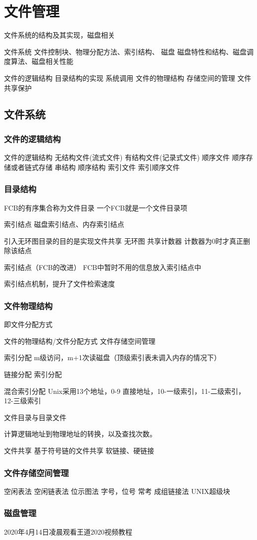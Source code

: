 \chapter{文件管理}

文件系统的结构及其实现，磁盘相关

文件系统
文件控制块、物理分配方法、索引结构、
磁盘
磁盘特性和结构、磁盘调度算法、磁盘相关性能

文件的逻辑结构
目录结构的实现
系统调用
文件的物理结构
存储空间的管理
文件共享保护

\section{文件系统}

\subsection{文件的逻辑结构}
文件的逻辑结构
	无结构文件(流式文件) 
	有结构文件(记录式文件) 
		顺序文件
			顺序存储或者链式存储
			串结构 顺序结构 
		索引文件
		索引顺序文件

\subsection{目录结构}
FCB的有序集合称为文件目录
一个FCB就是一个文件目录项

索引结点
磁盘索引结点、内存索引结点

引入无环图目录的目的是实现文件共享
无环图 共享计数器 计数器为0时才真正删除该结点


索引结点（FCB的改进）
FCB中暂时不用的信息放入索引结点中

索引结点机制，提升了文件检索速度


\subsection{文件物理结构}
即文件分配方式

文件的物理结构/文件分配方式
文件存储空间管理

索引分配
m级访问，m+1次读磁盘（顶级索引表未调入内存的情况下）

链接分配
索引分配

混合索引分配
Unix采用13个地址，0-9 直接地址，10-一级索引，11-二级索引，12-三级索引 

文件目录与目录文件

计算逻辑地址到物理地址的转换，以及查找次数。

文件共享
基于符号链的文件共享
软链接、硬链接


\subsection{文件存储空间管理}

空闲表法
空闲链表法
位示图法 字号，位号  常考 
成组链接法 UNIX超级块 


\subsection{磁盘管理}






2020年4月14日凌晨观看王道2020视频教程

